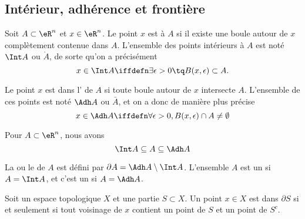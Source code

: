					\subsection{Intérieur, adhérence et frontière}

\begin{definition}
  Soit $A \subset \eR^n$ et $x \in \eR^n$. Le point $x$ est  à $A$ si il existe une boule autour de $x$ complètement contenue dans $A$. L'ensemble des points intérieurs à $A$ est noté $\Int A$ ou $\mathring A$, de sorte qu'on a précisément
  \begin{equation*}
    x \in \Int A \iffdefn  \exists \epsilon > 0 \tq
    B(x,\epsilon) \subset A.
  \end{equation*}
\end{definition}

\begin{definition}      \label{DEFooKYZXooDJLPyV}
Le point $x$ est dans l' de $A$ si toute boule autour de $x$ intersecte $A$. L'ensemble de ces points est noté $\Adh A$ ou $\bar A$, et on a donc de manière plus précise
\begin{equation}
	x \in \Adh A \iffdefn \forall \epsilon > 0, B(x,\epsilon) \cap A \neq \emptyset
\end{equation}
\end{definition}

\begin{proposition}
Pour $A \subset \eR^n$, nous avons
\begin{equation*}
	\Int A \subseteq A  \subseteq \Adh A
\end{equation*}
\end{proposition}

\begin{definition}
  La  ou le  de $A$ est défini par $\partial A = \Adh A \setminus \Int A$. L'ensemble $A$ est un  si $A = \Int A$, et c'est un  si $A = \Adh A$.
\end{definition}

\begin{lemma}      \label{LEMooEUYEooYcUfKr}
    Soit un espace topologique \( X\) et une partie \( S\subset X\). Un point \( x\in X\) est dans \( \partial S\) si et seulement si tout voisinage de \( x\) contient un point de \( S\) et un point de \( S^c\).
\end{lemma}

